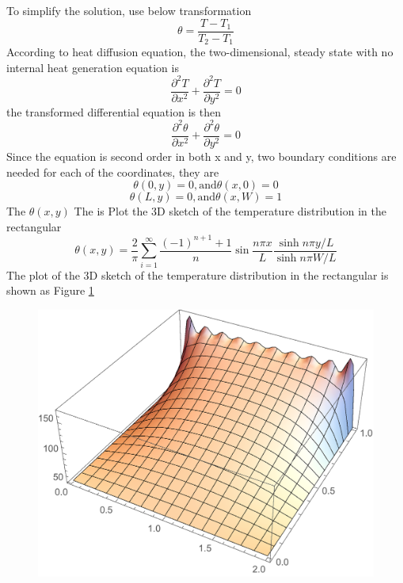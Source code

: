 \begin{solution}
To simplify the solution, use below transformation
$$\theta=\frac{T-T_1}{T_2-T_1}$$
According to heat diffusion equation, the two-dimensional, steady state with no internal heat generation equation is 
$$\frac{\partial^2 T}{\partial x^2}+\frac{\partial^2 T}{\partial y^2}=0$$
the transformed differential equation is then
$$\frac{\partial^2 \theta}{\partial x^2}+\frac{\partial^2 \theta}{\partial y^2}=0$$
Since the equation is second order in both x and y, two boundary conditions are needed for each of the coordinates, they are
$$\theta(0,y)=0,\text{and} \theta(x,0)=0$$
$$\theta(L,y)=0,\text{and} \theta(x,W)=1$$
The $\theta(x,y)$
The is Plot the 3D sketch of the temperature distribution in the rectangular
$$\theta(x,y)=\frac{2}{\pi}\sum\limits_{i=1}^\infty 
\frac{(-1)^{n+1}+1}{n}\sin{\frac{n\pi x}{L}}
\frac{\sinh{n\pi y/L}}{\sinh{n\pi W/L}}
$$
The plot of the 3D sketch of the temperature distribution in the rectangular is shown as Figure \ref{fig:3:2}
\begin{figure}[h!]
  \centering
    \includegraphics[scale=0.2]{figures/ch3/2}
    \caption{}
    \label{fig:3:2}
\end{figure}
\end{solution}


